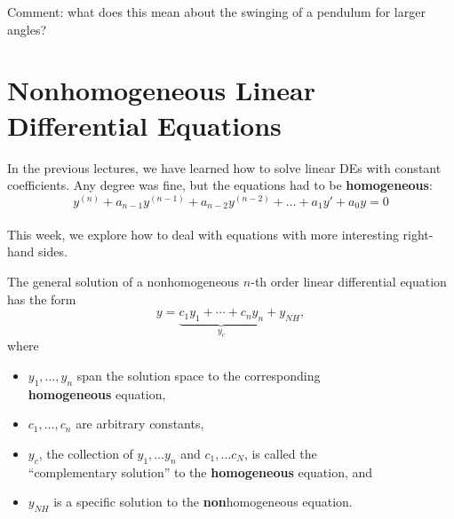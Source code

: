 Comment: what does this mean about the swinging of a pendulum for
larger angles?


\newpage
{}
\section*{Nonhomogeneous Linear Differential Equations}

In the previous lectures, we have learned how to solve linear DEs with
constant coefficients.  Any degree was fine, but the equations had to
be {\bf homogeneous}: \\[2ex]
$$ y^{(n)} + a_{n-1} y^{(n-1)} + a_{n-2} y^{(n-2)} + \ldots + a_1 y' + a_0 y = 0$$ \\[2ex]


This week, we explore how to deal with equations with more interesting
right-hand sides.




\vfill

\newpage

  The general solution of a nonhomogeneous $n$-th order linear differential
  equation has the form $$y = \underbrace{c_1 y_1 + \dotsb + c_n y_n}_{y_c} + y_{NH},$$
 where 
\begin{itemize}
\item $y_1, \dotsc, y_n$ span the solution space to the corresponding \\{\bf homogeneous} equation, 
\item $c_1, \dotsc, c_n$ are arbitrary constants,
\item $y_c$, the collection of $y_1, \ldots y_n$ and $c_1, \ldots
  c_N$, is called the \\``complementary solution'' to the {\bf homogeneous} equation, and
\item $y_{NH}$ is a specific solution to the {\bf non}homogeneous equation.
\end{itemize}


